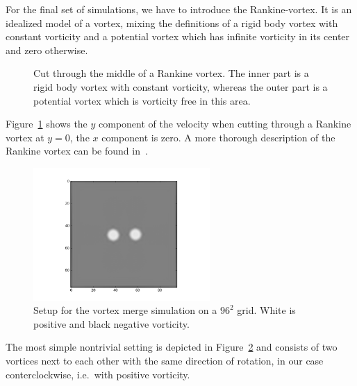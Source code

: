 
For the final set of simulations, we have to introduce the Rankine-vortex.
It is an idealized model of a vortex, mixing the definitions of a rigid body vortex
with constant vorticity and a potential vortex which has infinite vorticity in its center and zero otherwise.

\begin{figure}
  \centering
  
  \caption{Cut through the middle of a Rankine vortex.
  The inner part is a rigid body vortex with constant vorticity, whereas the outer part is a potential vortex which is vorticity free in this area.}
\label{fig: rankine}
\end{figure}

Figure~\ref{fig: rankine} shows the $y$ component of the velocity when cutting through a Rankine vortex at $y=0$, the $x$ component is zero.
A more thorough description of the Rankine vortex can be found in~\cite{giaiotti2006rankine}.

\begin{figure}
  \centering
  \includegraphics[width=0.6\textwidth]{../figures/rankine_vortex.png}  %
  \caption{Setup for the vortex merge simulation on a $96^2$ grid. White is positive and black negative vorticity.}
\label{fig: vortex merge setup}
\end{figure}

The most simple nontrivial setting is depicted in Figure~\ref{fig: vortex merge setup} and consists of two vortices next to each other with the same direction of rotation, in our case conterclockwise, i.e.\ with positive vorticity.
